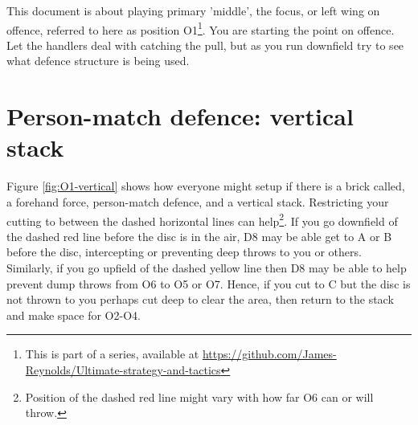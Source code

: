 \documentclass{tufte-handout}
\begin{document}
This document is about 
playing primary 'middle', 
the focus, 
or left wing 
on offence,
referred to here 
as position O1\footnote{This
is part of a series, 
available at
\url{https://github.com/James-Reynolds/Ultimate-strategy-and-tactics}}.
You are starting the point on offence. 
Let the handlers 
deal with catching the pull, but
as you run downfield
try to 
see
what defence structure
is being used. 

\section{Person-match defence: vertical stack}\label{sec:vertical}

Figure \ref{fig:O1-vertical} shows 
how everyone might 
setup 
if there is a brick called,
a forehand force, 
person-match defence, 
and a vertical stack.
Restricting your cutting 
to between 
the dashed 
horizontal 
lines 
can help\footnote{
Position of 
the dashed red line might vary
with how far O6 
can or will 
throw.}. 
If you go 
downfield of the dashed red line 
before the disc is in the air,
D8 may be able 
get to
A or B 
before the disc,
intercepting 
or preventing 
deep throws to 
you or others. 
Similarly, 
if you go 
upfield of the dashed yellow line
then D8 may 
be able to help
prevent dump throws from O6
to O5 
or O7.
Hence,
if you cut to C
but the disc is not thrown to you
perhaps cut deep 
to clear the area, 
then return to the stack
and make space for O2-O4. 
\end{document}
